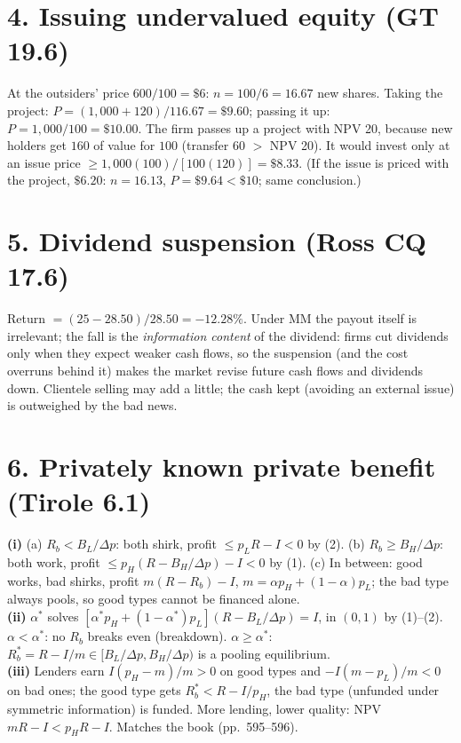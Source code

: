 \documentclass[11pt,a4paper]{article}
\begin{document}
\section*{4. Issuing undervalued equity (GT 19.6)}
At the outsiders' price $600/100=\$6$: $n=100/6=16.67$ new shares. Taking the project: $P=(1{,}000+120)/116.67=\$9.60$; passing it up: $P=1{,}000/100=\$10.00$. The firm passes up a project with NPV 20, because new holders get $160$ of value for $100$ (transfer 60 $>$ NPV 20). It would invest only at an issue price $\ge 1{,}000(100)/[100(120)]=\$8.33$. (If the issue is priced with the project, $\$6.20$: $n=16.13$, $P=\$9.64<\$10$; same conclusion.)

\section*{5. Dividend suspension (Ross CQ 17.6)}
Return $=(25-28.50)/28.50=-12.28\%$. Under MM the payout itself is irrelevant; the fall is the \emph{information content} of the dividend: firms cut dividends only when they expect weaker cash flows, so the suspension (and the cost overruns behind it) makes the market revise future cash flows and dividends down. Clientele selling may add a little; the cash kept (avoiding an external issue) is outweighed by the bad news.

\section*{6. Privately known private benefit (Tirole 6.1)}
\textbf{(i)} (a) $R_b<B_L/\Delta p$: both shirk, profit $\le p_LR-I<0$ by (2). (b) $R_b\ge B_H/\Delta p$: both work, profit $\le p_H(R-B_H/\Delta p)-I<0$ by (1). (c) In between: good works, bad shirks, profit $m(R-R_b)-I$, $m=\alpha p_H+(1-\alpha)p_L$; the bad type always pools, so good types cannot be financed alone.\\
\textbf{(ii)} $\alpha^*$ solves $[\alpha^*p_H+(1-\alpha^*)p_L](R-B_L/\Delta p)=I$, in $(0,1)$ by (1)--(2). $\alpha<\alpha^*$: no $R_b$ breaks even (breakdown). $\alpha\ge\alpha^*$: $R_b^*=R-I/m\in[B_L/\Delta p,B_H/\Delta p)$ is a pooling equilibrium.\\
\textbf{(iii)} Lenders earn $I(p_H-m)/m>0$ on good types and $-I(m-p_L)/m<0$ on bad ones; the good type gets $R_b^*<R-I/p_H$, the bad type (unfunded under symmetric information) is funded. More lending, lower quality: NPV $mR-I<p_HR-I$. Matches the book (pp.~595--596).
\end{document}
